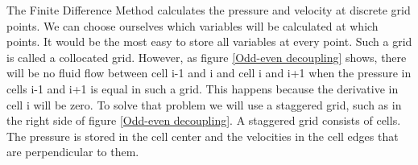 \documentclass{article}
\begin{document}
The Finite Difference Method calculates the pressure and velocity at discrete grid points. We can choose ourselves which variables will be calculated at which points. It would be the most easy to store all variables at every point. Such a grid is called a collocated grid. However, as figure \ref{Odd-even decoupling} shows, there will be no fluid flow between cell i-1 and i and cell i and i+1 when the pressure in cells i-1 and i+1 is equal in such a grid. This happens because the derivative in cell i will be zero. To solve that problem we will use a staggered grid, such as in the right side of figure \ref{Odd-even decoupling}. A staggered grid consists of cells. The pressure is stored in the cell center and the velocities in the cell edges that are perpendicular to them.


\newpage
\end{document}
